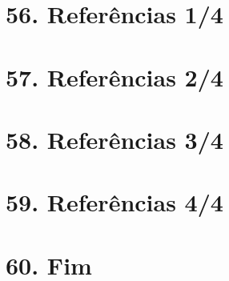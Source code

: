 \postextual{} %


% 

\chapter*{56. Referências 1/4}
\chapter*{57. Referências 2/4}
\chapter*{58. Referências 3/4}
\chapter*{59. Referências 4/4}
\chapter*{60. Fim}


